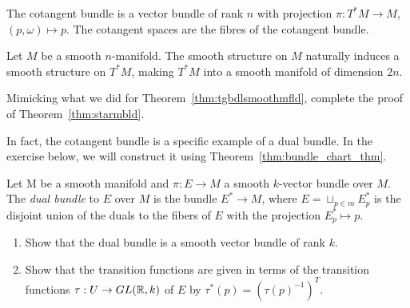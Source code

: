 The cotangent bundle is a vector bundle of rank $n$ with projection $\pi:T^*M\to M$, $(p,\omega)\mapsto p$.
The cotangent spaces are the fibres of the cotangent bundle.

\begin{theorem}\label{thm:starmbld}
  Let $M$ be a smooth $n$-manifold.
  The smooth structure on $M$ naturally induces a smooth structure on $T^*M$, making $T^*M$ into a smooth manifold of dimension $2n$.
\end{theorem}
\begin{exercise}\label{exe:prooftstarmbld}
  Mimicking what we did for Theorem~\ref{thm:tgbdlsmoothmfld}, complete the proof of Theorem~\ref{thm:starmbld}.
\end{exercise}

In fact, the cotangent bundle is a specific example of a dual bundle.
In the exercise below, we will construct it using Theorem~\ref{thm:bundle_chart_thm}.
\begin{exercise}
Let M be a smooth manifold and $\pi:E\to M$ a smooth $k$-vector bundle over $M$.
The \emph{dual bundle} to $E$ over $M$ is the bundle $E^* \to M$, where $E= \sqcup_{p\in m} E_p^*$ is the disjoint union of the duals to the fibers of $E$ with the projection $E_p^* \mapsto p$.
\begin{enumerate}
  \item Show that the dual bundle is a smooth vector bundle of rank $k$.
  \item Show that the transition functions are given in terms of the transition functions $\tau : U\to GL(\mathbb{R},k)$ of $E$ by $\tau^*(p) = (\tau(p)^{-1})^T$.
\end{enumerate}
\end{exercise}

